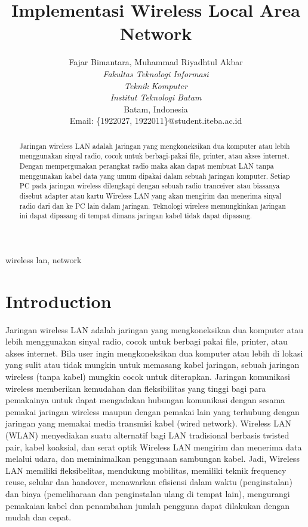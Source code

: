 \documentclass[conference]{IEEEtran}
\title{Implementasi Wireless Local Area Network}
\author{Fajar Bimantara\IEEEauthorrefmark{1}, Muhammad Riyadhtul Akbar\IEEEauthorrefmark{2}\\
\textit{Fakultas Teknologi Informasi}\\
\textit{Teknik Komputer}\\
\textit{Institut Teknologi Batam}\\
Batam, Indonesia\\
Email: \{\IEEEauthorrefmark{1}1922027, \IEEEauthorrefmark{2}1922011\}@student.iteba.ac.id}
\begin{document}
\maketitle

\begin{abstract}
Jaringan wireless LAN adalah jaringan yang mengkoneksikan dua komputer atau lebih menggunakan
sinyal radio, cocok untuk berbagi-pakai file, printer, atau akses internet. Dengan mempergunakan
perangkat radio maka akan dapat membuat LAN tanpa menggunakan kabel data yang umum dipakai dalam
sebuah jaringan komputer. Setiap PC pada jaringan wireless dilengkapi dengan sebuah radio tranceiver atau
biasanya disebut adapter atau kartu Wireless LAN yang akan mengirim dan menerima sinyal radio dari dan
ke PC lain dalam jaringan. Teknologi wireless memungkinkan jaringan ini dapat dipasang di tempat
dimana jaringan kabel tidak dapat dipasang.
\end{abstract}

\begin{IEEEkeywords}
    wireless lan, network
\end{IEEEkeywords}

\section{Introduction}
Jaringan wireless LAN adalah jaringan yang mengkoneksikan dua komputer atau lebih menggunakan sinyal radio, cocok untuk berbagipakai file, printer, atau akses internet. Bila user ingin mengkoneksikan dua komputer atau lebih di lokasi yang sulit atau tidak mungkin untuk memasang kabel jaringan, sebuah jaringan wireless (tanpa kabel) mungkin cocok untuk
diterapkan.
Jaringan komunikasi wireless memberikan kemudahan dan fleksibilitas yang tinggi bagi
para pemakainya untuk dapat mengadakan hubungan komunikasi dengan sesama pemakai jaringan wireless maupun dengan pemakai lain yang terhubung dengan jaringan yang memakai media transmisi kabel (wired network). Wireless LAN (WLAN) menyediakan suatu alternatif bagi LAN tradisional berbasis twisted pair, kabel
koaksial, dan serat optik Wireless LAN mengirim dan menerima data melalui udara, dan meminimalkan penggunaan sambungan kabel. Jadi, Wireless LAN memiliki fleksibelitas, mendukung mobilitas, memiliki
teknik frequency reuse, selular dan handover, menawarkan efisiensi dalam waktu (penginstalan) dan biaya (pemeliharaan dan penginstalan ulang di tempat lain), mengurangi pemakaian kabel dan penambahan jumlah
pengguna dapat dilakukan dengan mudah dan
cepat.
\end{document}
